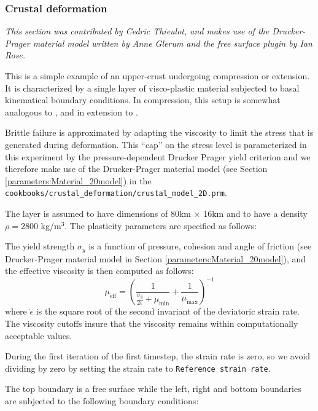 \subsubsection{Crustal deformation}
\label{sec:cookbooks-crustal-deformation}

\textit{This section was contributed by Cedric Thieulot, and makes use of the Drucker-Prager
material model written by Anne Glerum and the free surface plugin by Ian Rose.}

This is a simple example of an upper-crust undergoing compression or extension.
It is characterized by a single layer of visco-plastic material subjected to basal
kinematical boundary conditions. In compression, this setup is somewhat analogous
to \cite{will99}, and in extension to \cite{alht11}.

Brittle failure is approximated by adapting the viscosity to limit the stress
that is generated during deformation.
This ``cap'' on the stress level is parameterized in this experiment by the pressure-dependent
Drucker Prager yield criterion  and we therefore make use of the Drucker-Prager
material model (see Section \ref{parameters:Material_20model}) in the
{\tt cookbooks/crustal\_deformation/crustal\_model\_2D.prm}.

The layer is assumed to have dimensions of 80km $\times$ 16km and to have a density  $\rho=2800$ kg/m$^3$.
The plasticity parameters are specified as follows:



The yield strength $\sigma_y$ is a function of pressure, cohesion and angle of friction
(see Drucker-Prager material model in Section \ref{parameters:Material_20model}),
and the effective viscosity is then computed as follows:
\[
\mu_{\text{eff}} = \left( \frac{1}{ \frac{\sigma_y}{2 \dot{\epsilon}}+
\mu_{\text{min}}} + \frac{1}{\mu_{\text{max}}}  \right)^{-1}
\]
where $\dot{\epsilon}$ is the square root of the second invariant of the deviatoric strain rate.
The viscosity cutoffs insure that the viscosity remains within computationally acceptable values.

During the first iteration of the first timestep, the strain rate is zero, so
we avoid dividing by zero by setting the strain rate to {\tt Reference strain rate}.


The top boundary is a free surface while the left, right and bottom boundaries are subjected
to the following boundary conditions:

